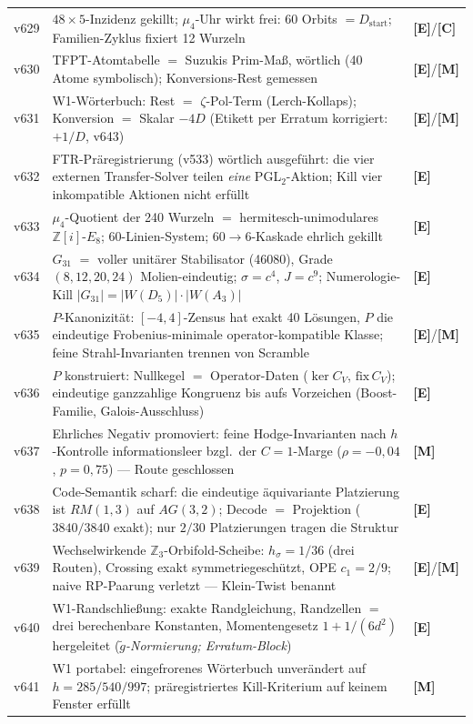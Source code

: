 \documentclass[11pt,a4paper]{article}
\newcommand{\E}{\textcolor{gut}{\textbf{[E]}}}
\newcommand{\C}{\textcolor{kern}{\textbf{[C]}}}
\newcommand{\M}{\textcolor{mess}{\textbf{[M]}}}
\begin{document}
\begin{longtable}{@{}l p{11.1cm} l@{}}
v629 & $48 \times 5$-Inzidenz gekillt; $\mu_4$-Uhr wirkt frei: 60 Orbits $= D_{\mathrm{start}}$; Familien-Zyklus fixiert 12 Wurzeln & \E/\C \\
v630 & TFPT-Atomtabelle $=$ Suzukis Prim-Maß, wörtlich (40 Atome symbolisch); Konversions-Rest gemessen & \E/\M \\
v631 & W1-Wörterbuch: Rest $=$ $\zeta$-Pol-Term (Lerch-Kollaps); Konversion $=$ Skalar $-4D$ (Etikett per Erratum korrigiert: $+1/D$, v643) & \E/\M \\
\midrule
v632 & FTR-Präregistrierung (v533) wörtlich ausgeführt: die vier externen Transfer-Solver teilen \emph{eine} PGL$_2$-Aktion; Kill \glqq{}vier inkompatible Aktionen\grqq{} nicht erfüllt & \E \\
v633 & $\mu_4$-Quotient der 240 Wurzeln $=$ hermitesch-unimodulares $\mathbb{Z}[i]$-$E_8$; 60-Linien-System; $60 \to 6$-Kaskade ehrlich gekillt & \E \\
v634 & $G_{31}$ $=$ voller unitärer Stabilisator (46080), Grade $(8,12,20,24)$ Molien-eindeutig; $\sigma = c^4$, $J = c^9$; Numerologie-Kill $|G_{31}| = |W(D_5)| \cdot |W(A_3)|$ & \E \\
v635 & $P$-Kanonizität: $[-4,4]$-Zensus hat exakt 40 Lösungen, $P$ die eindeutige Frobenius-minimale operator-kompatible Klasse; feine Strahl-Invarianten trennen von Scramble & \E/\M \\
v636 & $P$ konstruiert: Nullkegel $=$ Operator-Daten ($\ker C_V$, $\mathrm{fix}\,C_V$); eindeutige ganzzahlige Kongruenz bis aufs Vorzeichen (Boost-Familie, Galois-Ausschluss) & \E \\
v637 & Ehrliches Negativ promoviert: feine Hodge-Invarianten nach $h$-Kontrolle informationsleer bzgl.\ der $C = 1$-Marge ($\rho = -0{,}04$, $p = 0{,}75$) --- Route geschlossen & \M \\
v638 & Code-Semantik scharf: die eindeutige äquivariante Platzierung ist $RM(1,3)$ auf $AG(3,2)$; Decode $=$ Projektion ($3840/3840$ exakt); nur $2/30$ Platzierungen tragen die Struktur & \E \\
v639 & Wechselwirkende $\mathbb{Z}_3$-Orbifold-Scheibe: $h_\sigma = 1/36$ (drei Routen), Crossing exakt symmetriegeschützt, OPE $c_1 = 2/9$; naive RP-Paarung verletzt --- Klein-Twist benannt & \E/\M \\
v640 & W1-Randschließung: exakte Randgleichung, Randzellen $=$ drei berechenbare Konstanten, Momentengesetz $1 + 1/(6d^2)$ hergeleitet (\emph{$\tilde g$-Normierung; Erratum-Block}) & \E \\
v641 & W1 portabel: eingefrorenes Wörterbuch unverändert auf $h = 285/540/997$; präregistriertes Kill-Kriterium auf keinem Fenster erfüllt & \M \\

\end{longtable}
\end{document}
